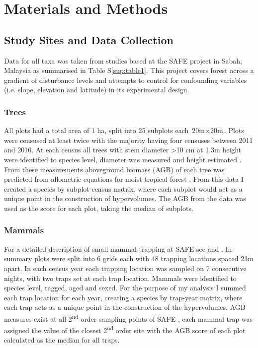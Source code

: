 
\section{Materials and Methods}


\subsection{Study Sites and Data Collection}

	Data for all taxa was taken from studies based at the SAFE project in Sabah, Malaysia \citep{Ewers2011} as summarised in Table S\ref{sup:table1}. This project covers forest across a gradient of disturbance levels and attempts to control for confounding variables (i.e. slope, elevation and latitude) in its experimental design. 

	\subsubsection*{Trees}
	
	All plots had a total area of 1 ha, split into 25 subplots each $\text{20m} \times \text{20m}$. Plots were censused at least twice with the majority having four censuses between 2011 and 2016. At each census all trees with stem diameter >10 cm at 1.3m height were identified to species level, diameter was measured and height estimated \citep{Riutta2018}. From these measurements aboveground biomass (AGB) of each tree was predicted from allometric equations for moist tropical forest \citep{Chave2005}. From this data I created a species by subplot-census matrix, where each subplot would act as a unique point in the construction of hypervolumes. The AGB from the data was used as the score for each plot, taking the median of subplots.

	\subsubsection*{Mammals}
	
	For a detailed description of small-mammal trapping at SAFE see \cite{Wearn2017} and \cite{Chapman2018}. In summary plots were split into 6 grids each with 48 trapping locations spaced 23m apart. In each census year each trapping location was sampled on 7 consecutive nights, with two traps set at each trap location. Mammals were identified to species level, tagged, aged and sexed. For the purpose of my analysis I summed each trap location for each year, creating a species by trap-year matrix, where each trap acts as a unique point in the construction of the hypervolumes. AGB measures exist at all 2\textsuperscript{nd} order sampling points of SAFE \citep{Pfeifer2016}, each mammal trap was assigned the value of the closest 2\textsuperscript{nd} order site with the AGB score of each plot calculated as the median for all traps.
	
